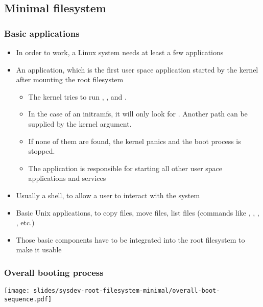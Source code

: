\subsection{Minimal filesystem}
\begin{frame}
  \frametitle{Basic applications}
  \begin{itemize}
  \item In order to work, a Linux system needs at least a few
    applications
  \item An  application, which is the first user space
    application started by the kernel after mounting the root
    filesystem
    \begin{itemize}
    \item The kernel tries to run , ,
       and .
    \item In the case of an initramfs, it will only look for
      . Another path can be supplied by the 
      kernel argument.
    \item If none of them are found, the kernel panics and the boot
      process is stopped.
    \item The  application is responsible for starting all other
      user space applications and services
    \end{itemize}
  \item Usually a shell, to allow a user to interact with the system
  \item Basic Unix applications, to copy files, move files, list files
    (commands like , , , ,
    etc.)
  \item Those basic components have to be integrated into the root
    filesystem to make it usable
  \end{itemize}
\end{frame}

\begin{frame}
  \frametitle{Overall booting process}
  \begin{center}
    \texttt{[image: slides/sysdev-root-filesystem-minimal/overall-boot-sequence.pdf]}
  \end{center}
\end{frame}
